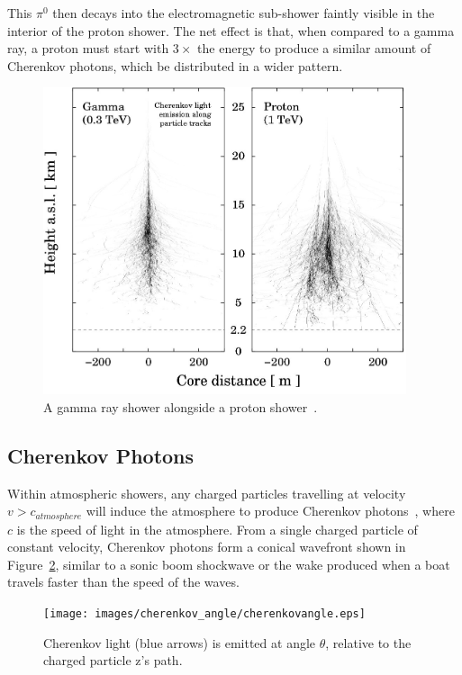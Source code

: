   This $\pi^{0}$ then decays into the electromagnetic sub-shower faintly visible in the interior of the proton shower.
  The net effect is that, when compared to a gamma ray, a proton must start with $3\times$ the energy to produce a similar amount of Cherenkov photons, which be distributed in a wider pattern.

  \begin{figure}[ht]
    \centering
    \includegraphics[width=0.95\textwidth]{images/showers_gamma_proton}
    \caption[Gamma Ray and Proton Showers]{
      A gamma ray shower alongside a proton shower~\cite{Bernlohr2008149}.
    }
    \label{fig:gamma_vs_proton_airshower}
  \end{figure}
  
  \FloatBarrier

  \subsection{Cherenkov Photons}\label{sec:cherenkov}

  Within atmospheric showers, any charged particles travelling at velocity $v > c_{atmosphere}$ will induce the atmosphere to produce Cherenkov photons~\cite{cherenkov}, where $c$ is the speed of light in the atmosphere.
  From a single charged particle of constant velocity, Cherenkov photons form a conical wavefront shown in Figure~\ref{fig:cherenkovangle}, similar to a sonic boom shockwave or the wake produced when a boat travels faster than the speed of the waves.

  \begin{figure}[ht]
    \centering
    \texttt{[image: images/cherenkov\_angle/cherenkovangle.eps]}
    \caption[Chernekov Emission Angle]{
      Cherenkov light (blue arrows) is emitted at angle $\theta$, relative to the charged particle z's path.
    }
    \label{fig:cherenkovangle}
  \end{figure}

